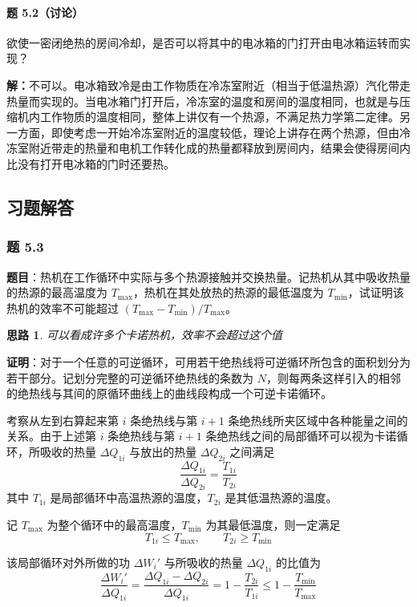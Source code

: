 \documentclass[UTF8]{ctexart}
\newtheorem{thoughts}{思路}[subsection]
\begin{document}
\paragraph{题 5.2（讨论）}
欲使一密闭绝热的房间冷却，是否可以将其中的电冰箱的门打开由电冰箱运转而实现？

\textbf{解：}不可以。电冰箱致冷是由工作物质在冷冻室附近（相当于低温热源）汽化带走热量而实现的。当电冰箱门打开后，冷冻室的温度和房间的温度相同，也就是与压缩机内工作物质的温度相同，整体上讲仅有一个热源，不满足热力学第二定律。另一方面，即使考虑一开始冷冻室附近的温度较低，理论上讲存在两个热源，但由冷冻室附近带走的热量和电机工作转化成的热量都释放到房间内，结果会使得房间内比没有打开电冰箱的门时还要热。

\subsection{习题解答}

\subsubsection{题 5.3}

\textbf{题目}：热机在工作循环中实际与多个热源接触并交换热量。记热机从其中吸收热量的热源的最高温度为 $T_{\max}$，热机在其处放热的热源的最低温度为 $T_{\min}$，试证明该热机的效率不可能超过 $(T_{\max}-T_{\min})/T_{\max}$。

\begin{thoughts}
  可以看成许多个卡诺热机，效率不会超过这个值
\end{thoughts}

\textbf{证明}：对于一个任意的可逆循环，可用若干绝热线将可逆循环所包含的面积划分为若干部分。记划分完整的可逆循环绝热线的条数为 $N$，则每两条这样引入的相邻的绝热线与其间的原循环曲线上的曲线段构成一个可逆卡诺循环。

考察从左到右算起来第 $i$ 条绝热线与第 $i+1$ 条绝热线所夹区域中各种能量之间的关系。由于上述第 $i$ 条绝热线与第 $i+1$ 条绝热线之间的局部循环可以视为卡诺循环，所吸收的热量 $\Delta Q_{1i}$ 与放出的热量 $\Delta Q_{2i}$ 之间满足
\[
\frac{\Delta Q_{1i}}{\Delta Q_{2i}}=\frac{T_{1i}}{T_{2i}}
\]
其中 $T_{1i}$ 是局部循环中高温热源的温度，$T_{2i}$ 是其低温热源的温度。

记 $T_{\max}$ 为整个循环中的最高温度，$T_{\min}$ 为其最低温度，则一定满足
\[
T_{1i}\le T_{\max},\qquad T_{2i}\ge T_{\min}
\]

该局部循环对外所做的功 $\Delta W_i'$ 与所吸收的热量 $\Delta Q_{1i}$ 的比值为
\[
\frac{\Delta W_i'}{\Delta Q_{1i}}
=\frac{\Delta Q_{1i}-\Delta Q_{2i}}{\Delta Q_{1i}}
=1-\frac{T_{2i}}{T_{1i}}
\le 1-\frac{T_{\min}}{T_{\max}}
\]
\end{document}
